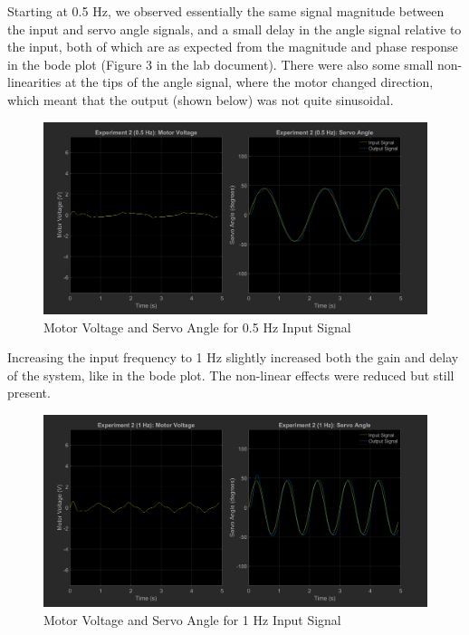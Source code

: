 \documentclass[12pt]{article}
\begin{document}
Starting at 0.5 Hz, we observed essentially the same signal magnitude between the input and servo angle signals, and a small delay in the angle signal relative to the input, both of which are as expected from the magnitude and phase response in the bode plot (Figure 3 in the lab document). There were also some small non-linearities at the tips of the angle signal, where the motor changed direction, which meant that the output (shown below) was not quite sinusoidal.
\begin{figure}[h!]
    \centering
    \includegraphics[width=\textwidth]{exp2_0.5}
    \caption{\label{fig:exp2_0.5}Motor Voltage and Servo Angle for 0.5 Hz Input Signal}
\end{figure}

Increasing the input frequency to 1 Hz slightly increased both the gain and delay of the system, like in the bode plot. The non-linear effects were reduced but still present.
\begin{figure}[h!]
    \centering
    \includegraphics[width=\textwidth]{exp2_1}
    \caption{\label{fig:exp2_1}Motor Voltage and Servo Angle for 1 Hz Input Signal}
\end{figure}
\end{document}
